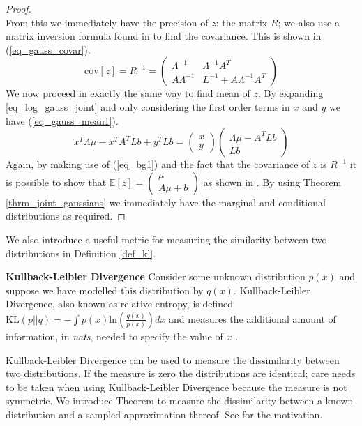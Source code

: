 \begin{proof}
\begin{equation}
\end{equation}
From this we immediately have the precision of $z$: the matrix $R$; we also use a matrix inversion formula found in \cite{bishop} to find the covariance. This is shown in (\ref{eq_gauss_covar}).
\begin{equation}
\text{cov}[z] = R^{-1} = \begin{pmatrix}
\Lambda^{-1} & \Lambda^{-1}A^T \\ A\Lambda^{-1} & L^{-1}+A\Lambda^{-1}A^T
\end{pmatrix}
\label{eq_gauss_covar}
\end{equation}
We now proceed in exactly the same way to find mean of $z$. By expanding \ref{eq_log_gauss_joint} and only considering the first order terms in $x$ and $y$ we have (\ref{eq_gauss_mean1}).
\begin{equation}
x^T\Lambda\mu-x^TA^TLb+y^TLb = \begin{pmatrix}
x \\ y
\end{pmatrix}\begin{pmatrix}
\Lambda\mu - A^TLb \\Lb
\end{pmatrix}
\label{eq_gauss_mean1}
\end{equation}
Again, by making use of (\ref{eq_bg1}) and the fact that the covariance of $z$ is $R^{-1}$ it is possible to show that $\mathbb{E}[z]=\begin{pmatrix}
\mu \\ A\mu +b
\end{pmatrix}$ as shown in \cite{bishop}. By using Theorem \ref{thrm_joint_gaussians} we immediately have the marginal and conditional distributions as required.
\end{proof}
We also introduce a useful metric for measuring the similarity between two distributions in Definition \ref{def_kl}. 
\begin{defn}
\textbf{Kullback-Leibler Divergence} Consider some unknown distribution $p(x)$ and suppose we have modelled this distribution by $q(x)$. Kullback-Leibler Divergence, also known as relative entropy, is defined $\text{KL}(p||q) = -\int p(x)\text{ln}\left(\frac{q(x)}{p(x)}\right)dx$ and measures the additional amount of information, in \textit{nats}, needed to specify the value of $x$ \cite{bishop}. 
\label{def_kl}
\end{defn}
Kullback-Leibler Divergence can be used to measure the dissimilarity between two distributions. If the measure is zero the distributions are identical; care needs to be taken when using Kullback-Leibler Divergence because the measure is not symmetric. We introduce Theorem to measure the dissimilarity between a known distribution and a sampled approximation thereof. See \cite{bishop} for the motivation.
